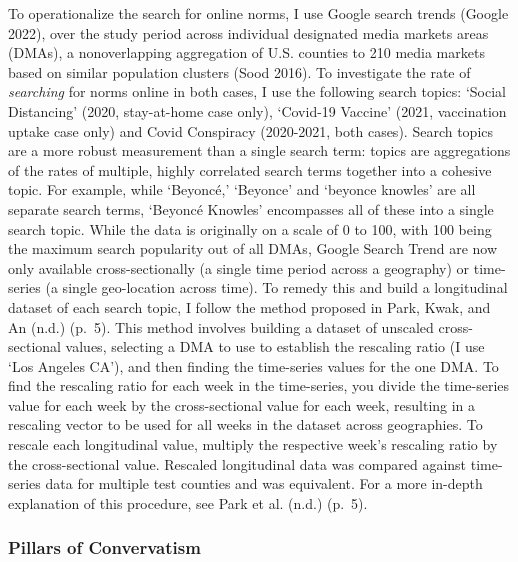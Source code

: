 To operationalize the search for online norms, I use Google search trends (Google 2022),
over the study period across individual designated media markets areas (DMAs), a
nonoverlapping aggregation of U.S. counties to 210 media markets based on
similar population clusters (Sood 2016). To investigate the rate of \emph{searching} for norms
online in both cases, I use the following search topics: `Social Distancing'
(2020, stay-at-home case only), `Covid-19 Vaccine' (2021, vaccination uptake case
only) and Covid Conspiracy (2020-2021, both cases). Search topics are a more
robust measurement than a single search term: topics are aggregations of the
rates of multiple, highly correlated search terms together into a cohesive
topic. For example, while `Beyoncé,' `Beyonce' and `beyonce knowles' are all
separate search terms, `Beyoncé Knowles' encompasses all of these into a single
search topic. While the data is originally on a scale of 0 to 100, with
100 being the maximum search popularity out of all DMAs, Google Search Trend are
now only available cross-sectionally (a single time period across a geography)
or time-series (a single geo-location across time). To remedy this and build a
longitudinal dataset of each search topic, I follow the method proposed in
Park, Kwak, and An (n.d.) (p.~5). This method involves building a dataset of unscaled
cross-sectional values, selecting a DMA to use to establish the rescaling ratio
(I use `Los Angeles CA'), and then finding the time-series values for the one
DMA. To find the rescaling ratio for each week in the time-series, you divide
the time-series value for each week by the cross-sectional value for each week,
resulting in a rescaling vector to be used for all weeks in the dataset across
geographies. To rescale each longitudinal value, multiply the respective week's
rescaling ratio by the cross-sectional value. Rescaled longitudinal data was
compared against time-series data for multiple test counties and was equivalent.
For a more in-depth explanation of this procedure, see Park et al. (n.d.) (p.~5).

\hypertarget{pillars-of-convervatism}{%
\subsubsection{Pillars of Convervatism}\label{pillars-of-convervatism}}

